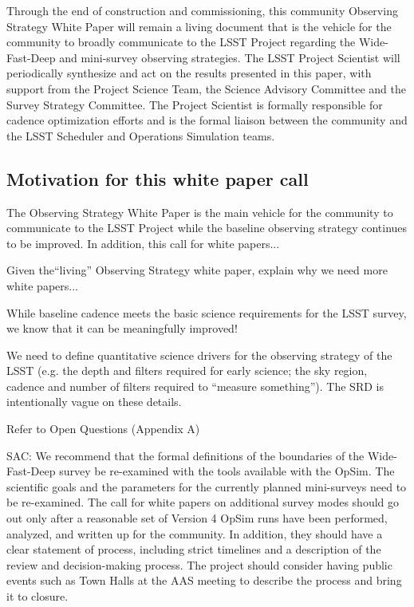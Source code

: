 \documentclass[DM,lsstdraft,toc,usenatbib]{lsstdoc}
\begin{document}
Through the end of construction and commissioning, this community Observing Strategy 
White Paper will remain a living document that is the vehicle for the community to broadly 
communicate to the LSST Project regarding the Wide-Fast-Deep and mini-survey observing 
strategies. The LSST Project Scientist will periodically synthesize and act on the results presented 
in this paper, with support from the Project Science Team, the Science Advisory Committee and 
the Survey Strategy Committee. The Project Scientist is formally responsible for cadence optimization 
efforts and is the formal liaison between the community and the LSST Scheduler and Operations 
Simulation teams.


\subsection{Motivation for this white paper call}

The Observing Strategy White Paper is the main vehicle for the community to communicate to the LSST Project 
while the baseline observing strategy continues to be improved. In addition, this call for white papers... 

Given the``living'' Observing Strategy white paper, explain why we need more white papers...

While baseline cadence meets the basic science requirements for the LSST survey, we know that it can be meaningfully improved!

We need to define quantitative science drivers for the observing strategy of the LSST (e.g. the depth and 
filters required for early science; the sky region, cadence and number of filters required to ``measure something'').
The SRD is intentionally vague on these details. 

Refer to Open Questions (Appendix A) 

SAC: We recommend that the formal definitions of the boundaries of the
     Wide-Fast-Deep survey be re-examined with the tools available with
     the OpSim. The scientific goals and the parameters for the currently planned
   mini-surveys need to be re-examined. The call for white papers on additional survey modes should go out
   only after a reasonable set of Version 4 OpSim runs have been
   performed, analyzed, and written up for the community. In
   addition, they should have a clear statement of process, including
   strict timelines and a description of the review and decision-making
   process.   The project should consider having public events such as
   Town Halls at the AAS meeting to describe the process and bring it
   to closure. 
\end{document}
